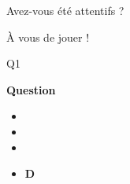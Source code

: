 \begin{frame}[standout]

    Avez-vous été attentifs ?

    À vous de jouer !

\end{frame}

{

\begin{frame}{Q1}

    \textbf{Question}

    \begin{itemize}
        \item {}
        \item {}
        \item {}
        \item \textbf<2>{\textcolor{kh-yellow}{D}}
    \end{itemize}

\end{frame}

}
